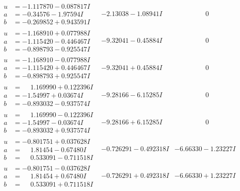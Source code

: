 \documentclass[1p]{elsarticle_modified}
\theoremstyle{definition}
\begin{document}
$$\begin{array}{c|c|c}
\begin{aligned}
u &= -1.117870 - 0.087817 I \\
a &= -0.34576 - 1.97594 I \\
b &= -0.269852 + 0.943591 I\end{aligned}
 & -2.13038 - 1.08941 I & \phantom{-0.000000 } 0 \\ \hline\begin{aligned}
u &= -1.168910 + 0.077988 I \\
a &= -1.115420 - 0.446467 I \\
b &= -0.898793 - 0.925547 I\end{aligned}
 & -9.32041 - 0.45884 I & \phantom{-0.000000 } 0 \\ \hline\begin{aligned}
u &= -1.168910 - 0.077988 I \\
a &= -1.115420 + 0.446467 I \\
b &= -0.898793 + 0.925547 I\end{aligned}
 & -9.32041 + 0.45884 I & \phantom{-0.000000 } 0 \\ \hline\begin{aligned}
u &= \phantom{-}1.169990 + 0.122396 I \\
a &= -1.54997 + 0.03674 I \\
b &= -0.893032 - 0.937574 I\end{aligned}
 & -9.28166 - 6.15285 I & \phantom{-0.000000 } 0 \\ \hline\begin{aligned}
u &= \phantom{-}1.169990 - 0.122396 I \\
a &= -1.54997 - 0.03674 I \\
b &= -0.893032 + 0.937574 I\end{aligned}
 & -9.28166 + 6.15285 I & \phantom{-0.000000 } 0 \\ \hline\begin{aligned}
u &= -0.801751 + 0.037628 I \\
a &= \phantom{-}1.81454 - 0.67480 I \\
b &= \phantom{-}0.533091 - 0.711518 I\end{aligned}
 & -0.726291 - 0.492318 I & -6.66330 - 1.23227 I \\ \hline\begin{aligned}
u &= -0.801751 - 0.037628 I \\
a &= \phantom{-}1.81454 + 0.67480 I \\
b &= \phantom{-}0.533091 + 0.711518 I\end{aligned}
 & -0.726291 + 0.492318 I & -6.66330 + 1.23227 I \\ \hline\begin{aligned}

\end{aligned}
\end{array}$$
\end{document}
